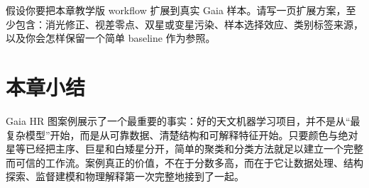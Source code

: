 \begin{exercisebox}[开放练习]
假设你要把本章教学版 workflow 扩展到真实 Gaia 样本。请写一页扩展方案，至少包含：消光修正、视差零点、双星或变星污染、样本选择效应、类别标签来源，以及你会怎样保留一个简单 baseline 作为参照。
\end{exercisebox}

\section{本章小结}

Gaia HR 图案例展示了一个最重要的事实：好的天文机器学习项目，并不是从“最复杂模型”开始，而是从可靠数据、清楚结构和可解释特征开始。只要颜色与绝对星等已经把主序、巨星和白矮星分开，简单的聚类和分类方法就足以建立一个完整而可信的工作流。案例真正的价值，不在于分数多高，而在于它让数据处理、结构探索、监督建模和物理解释第一次完整地接到了一起。
